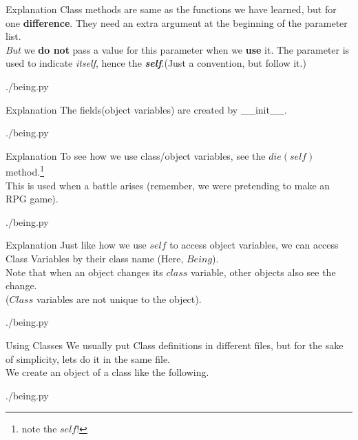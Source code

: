 \documentclass{beamer}
\begin{document}
\begin{frame}{Explanation}
  Class methods are same as the functions we have learned, but for one
  \textbf{difference}. They need an extra argument at the beginning of the
  parameter list.\\\textit{But} we \textbf{do not} pass a value for this parameter when we
  \textbf{use} it. The parameter is used to indicate \textit{itself}, hence the
  \textit{\textbf{self}}.(Just a convention, but follow it.)
  \begin{lstinputlisting}[firstline=5, lastline=8]
    {./being.py}
  \end{lstinputlisting}
\end{frame}

\begin{frame}{Explanation}
  The fields(object variables) are created by \_\_init\_\_.\\
  \begin{lstinputlisting}[firstline=7, lastline=12]
    {./being.py}
  \end{lstinputlisting}
\end{frame}

\begin{frame}{Explanation}
  To see how we use class/object variables, see the $die(self)$
  method.\footnote{note the $self$!}\\
  This is used when a battle arises (remember, we were pretending to make an RPG game).
  \begin{lstinputlisting}[firstline=17, lastline=19]
    {./being.py}
  \end{lstinputlisting}
\end{frame}

\begin{frame}{Explanation}
  Just like how we use $self$ to access object variables, we can access Class
  Variables by their class name (Here, $Being$).\\
  Note that when an object changes its $class$ variable, other objects also see
  the change.\\($Class$ variables are not unique to the object).
  \begin{lstinputlisting}[firstline=20, lastline=22]
    {./being.py}
  \end{lstinputlisting}
\end{frame}


\begin{frame}{Using Classes}
  We usually put Class definitions in different files, but for the sake of
  simplicity, lets do it in the same file.\\
  We create an object of a class like the following.
  \begin{lstinputlisting}[firstline=25, lastline=27]
    {./being.py}
  \end{lstinputlisting}
\end{frame}
\end{document}
